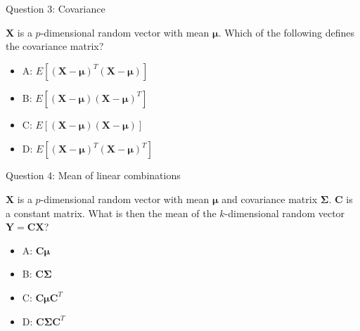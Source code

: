 \documentclass[ignorenonframetext,]{beamer}
\providecommand{\tightlist}{%
  \setlength{\itemsep}{0pt}\setlength{\parskip}{0pt}}
\begin{document}
\begin{frame}

\begin{block}{Question 3: Covariance}

\vspace{2mm}

\(\boldsymbol{X}\) is a \(p\)-dimensional random vector with mean
\(\boldsymbol{\mu}\). Which of the following defines the covariance
matrix?

\begin{itemize}
\tightlist
\item
  A:
  \(E[(\boldsymbol{X}-\boldsymbol{\mu})^T(\boldsymbol{X}-\boldsymbol{\mu})]\)
\item
  B:
  \(E[(\boldsymbol{X}-\boldsymbol{\mu})(\boldsymbol{X}-\boldsymbol{\mu})^T]\)
\item
  C:
  \(E[(\boldsymbol{X}-\boldsymbol{\mu})(\boldsymbol{X}-\boldsymbol{\mu})]\)\\
\item
  D:
  \(E[(\boldsymbol{X}-\boldsymbol{\mu})^T(\boldsymbol{X}-\boldsymbol{\mu})^T]\)
\end{itemize}

\end{block}

\end{frame}

\begin{frame}

\begin{block}{Question 4: Mean of linear combinations}

\vspace{2mm}

\(\boldsymbol{X}\) is a \(p\)-dimensional random vector with mean
\(\boldsymbol{\mu}\) and covariance matrix \(\boldsymbol\Sigma\).
\(\boldsymbol{C}\) is a constant matrix. What is then the mean of the
\(k\)-dimensional random vector
\(\boldsymbol{Y}=\boldsymbol{C}\boldsymbol{X}\)?

\begin{itemize}
\tightlist
\item
  A: \(\boldsymbol{C}\boldsymbol{\mu}\)
\item
  B: \(\boldsymbol{C}\boldsymbol\Sigma\)
\item
  C: \(\boldsymbol{C}\boldsymbol{\mu}\boldsymbol{C}^T\)
\item
  D: \(\boldsymbol{C}\boldsymbol\Sigma\boldsymbol{C}^T\)
\end{itemize}

\end{block}

\end{frame}
\end{document}
